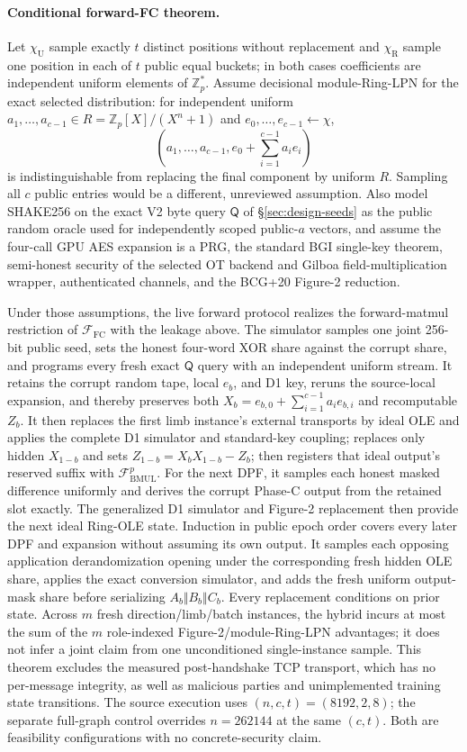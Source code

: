 \documentclass[11pt]{article}
\newcommand{\Z}{\mathbb{Z}}
\begin{document}
\paragraph{Conditional forward-FC theorem.}
Let $\chi_{\mathrm U}$ sample exactly $t$ distinct positions without
replacement and $\chi_{\mathrm R}$ sample one position in each of $t$ public
equal buckets; in both cases coefficients are independent uniform elements of
$\Z_p^*$. Assume decisional module-Ring-LPN for the exact selected distribution:
for independent uniform $a_1,\ldots,a_{c-1}\in R=\Z_p[X]/(X^n+1)$ and
$e_0,\ldots,e_{c-1}\leftarrow\chi$,
\[
 (a_1,\ldots,a_{c-1},e_0+\sum_{i=1}^{c-1}a_i e_i)
\]
is indistinguishable from replacing the final component by uniform $R$.
Sampling all $c$ public entries would be a different, unreviewed assumption.
Also model SHAKE256 on the exact V2 byte query $\mathsf Q$ of
\S\ref{sec:design-seeds} as the public random oracle used for independently
scoped public-$a$ vectors, and assume the four-call GPU AES expansion is a PRG,
the standard BGI single-key theorem, semi-honest security of the selected OT
backend and Gilboa field-multiplication wrapper, authenticated channels, and
the BCG+20 Figure-2 reduction.

Under those assumptions, the live forward protocol realizes the forward-matmul
restriction of $\mathcal F_{\mathrm{FC}}$ with the leakage above. The simulator
samples one joint 256-bit public seed, sets the honest four-word XOR share
against the corrupt share, and programs every fresh exact $\mathsf Q$ query
with an independent uniform stream. It retains the corrupt random tape,
local $e_b$, and D1 key, reruns the source-local expansion, and thereby
preserves both
$X_b=e_{b,0}+\sum_{i=1}^{c-1}a_i e_{b,i}$ and recomputable $Z_b$. It then
replaces the first limb instance's external transports by ideal OLE and applies
the complete D1 simulator and standard-key coupling; replaces only hidden
$X_{1-b}$ and sets $Z_{1-b}=X_bX_{1-b}-Z_b$; then registers that ideal
output's reserved suffix with $\mathcal F_{\mathrm{BMUL}}^p$. For the next DPF,
it samples each honest masked difference uniformly and derives the corrupt
Phase-C output from the retained slot exactly. The generalized D1 simulator and
Figure-2 replacement then provide the next ideal Ring-OLE state. Induction in
public epoch order covers every later DPF and
expansion without assuming its own output. It samples each opposing application
derandomization opening under the corresponding fresh hidden OLE share, applies
the exact conversion simulator, and adds the fresh uniform output-mask share
before serializing $A_b\Vert B_b\Vert C_b$. Every replacement conditions on
prior state. Across $m$ fresh direction/limb/batch instances, the hybrid incurs
at most the sum of the $m$ role-indexed Figure-2/module-Ring-LPN advantages; it
does not infer a joint claim from one unconditioned single-instance sample.
This theorem excludes the measured post-handshake TCP transport, which has no
per-message integrity, as well as malicious parties and unimplemented training
state transitions. The source execution uses $(n,c,t)=(8192,2,8)$; the separate
full-graph control overrides $n=262144$ at the same $(c,t)$. Both are feasibility
configurations with no concrete-security claim.
\end{document}
